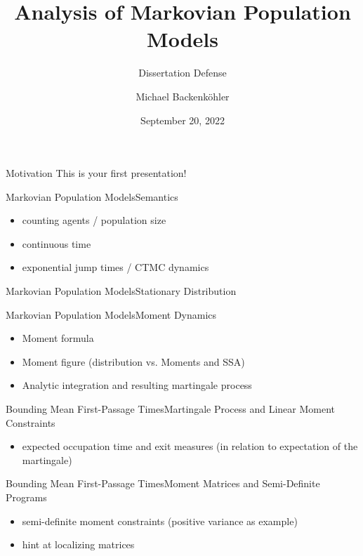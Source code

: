 \documentclass{beamer}
\title{Analysis of Markovian Population Models}
\subtitle{Dissertation Defense}
\author{Michael Backenk\"{o}hler}
\institute{Saarland Informatics Campus}
\date{September 20, 2022}
\begin{document}
\begin{frame}
\titlepage
\end{frame}

\begin{frame}{Motivation}
    This is your first presentation!
\end{frame}

\begin{frame}{Markovian Population Models}{Semantics}
  \begin{itemize}
    \item counting agents / population size
    \item continuous time
    \item exponential jump times / CTMC dynamics
  \end{itemize}
\end{frame}

\begin{frame}{Markovian Population Models}{Stationary Distribution}
\end{frame}

\begin{frame}{Markovian Population Models}{Moment Dynamics}
  \begin{itemize}
    \item Moment formula
    \item Moment figure (distribution vs. Moments and SSA)
    \item Analytic integration and resulting martingale process
  \end{itemize}
\end{frame}

\begin{frame}{Bounding Mean First-Passage Times}{Martingale Process and Linear Moment Constraints}
  \begin{itemize}
      \item expected occupation time and exit measures (in relation to expectation of the martingale)
  \end{itemize}
\end{frame}

\begin{frame}{Bounding Mean First-Passage Times}{Moment Matrices and Semi-Definite Programs}
  \begin{itemize}
    \item semi-definite moment constraints (positive variance as example)
    \item hint at localizing matrices
  \end{itemize}
\end{frame}
\end{document}
